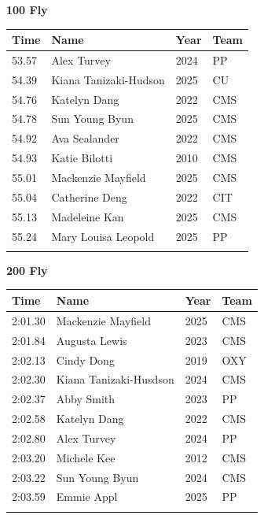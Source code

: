 \vspace{1.2em}
\noindent\begin{minipage}[t]{0.98\textwidth}
\centering
\textbf{\textcolor{teamprimary}{100 Fly}}\par
\vspace{0.5em}
\centering
\small
\renewcommand{\arraystretch}{1.0}
\setlength{\tabcolsep}{4pt}
\begin{tabular}{@{}p{2.5cm}p{4.5cm}p{1.5cm}p{2.5cm}@{}}
\toprule
\textbf{Time} & \textbf{Name} & \textbf{Year} & \textbf{Team} \\
\midrule
53.57 & Alex Turvey & 2024 & PP \\
54.39 & Kiana Tanizaki-Hudson & 2025 & CU \\
54.76 & Katelyn Dang & 2022 & CMS \\
54.78 & Sun Young Byun & 2025 & CMS \\
54.92 & Ava Sealander & 2022 & CMS \\
54.93 & Katie Bilotti & 2010 & CMS \\
55.01 & Mackenzie Mayfield & 2025 & CMS \\
55.04 & Catherine Deng & 2022 & CIT \\
55.13 & Madeleine Kan & 2025 & CMS \\
55.24 & Mary Louisa Leopold & 2025 & PP \\
\bottomrule
\vspace{0.5em}
\end{tabular}
\end{minipage}
\vspace{1.2em}
\noindent\begin{minipage}[t]{0.98\textwidth}
\centering
\textbf{\textcolor{teamprimary}{200 Fly}}\par
\vspace{0.5em}
\centering
\small
\renewcommand{\arraystretch}{1.0}
\setlength{\tabcolsep}{4pt}
\begin{tabular}{@{}p{2.5cm}p{4.5cm}p{1.5cm}p{2.5cm}@{}}
\toprule
\textbf{Time} & \textbf{Name} & \textbf{Year} & \textbf{Team} \\
\midrule
2:01.30 & Mackenzie Mayfield & 2025 & CMS \\
2:01.84 & Augusta Lewis & 2023 & CMS \\
2:02.13 & Cindy Dong & 2019 & OXY \\
2:02.30 & Kiana Tanizaki-Husdson & 2024 & CMS \\
2:02.37 & Abby Smith & 2023 & PP \\
2:02.58 & Katelyn Dang & 2022 & CMS \\
2:02.80 & Alex Turvey & 2024 & PP \\
2:03.20 & Michele Kee & 2012 & CMS \\
2:03.22 & Sun Young Byun & 2024 & CMS \\
2:03.59 & Emmie Appl & 2025 & PP \\
\bottomrule
\vspace{0.5em}
\end{tabular}
\end{minipage}
